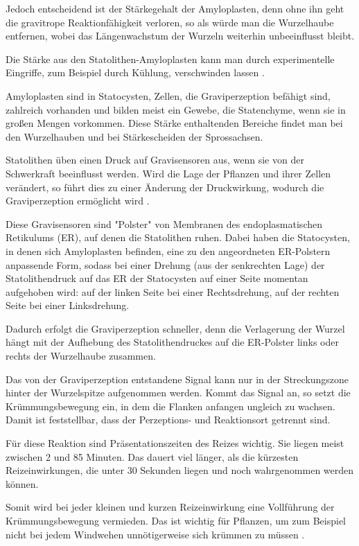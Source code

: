 \documentclass[
a4paper, 
11pt, 
ngerman,
listof=totoc,
bibliography=totocnumbered,
abstracton
]{scrreprt}
\begin{document}
Jedoch entscheidend ist der Stärkegehalt  der Amyloplasten, denn ohne ihn geht die gravitrope Reaktionfähigkeit verloren, so als würde man die Wurzelhaube entfernen, wobei das Längenwachstum der Wurzeln weiterhin unbeeinflusst bleibt.

Die Stärke aus den Statolithen-Amyloplasten kann man durch experimentelle Eingriffe, zum Beispiel durch Kühlung, verschwinden lassen \parencite[452]{Strasburger}.

Amyloplasten sind in Statocysten, Zellen, die Graviperzeption befähigt sind, zahlreich vorhanden und bilden meist ein Gewebe, die Statenchyme, wenn sie in großen Mengen vorkommen. Diese Stärke enthaltenden Bereiche findet man bei den Wurzelhauben und bei Stärkescheiden der Sprossachsen.  

Statolithen üben einen Druck auf Gravisensoren aus, wenn sie von der Schwerkraft beeinflusst werden. Wird die Lage der Pflanzen und ihrer Zellen verändert, so führt dies zu einer Änderung der Druckwirkung, wodurch die Graviperzeption ermöglicht wird \parencite[501f]{Nultsch}.

Diese Gravisensoren sind "Polster" von Membranen des endoplasmatischen Retikulums (ER), auf denen die Statolithen ruhen.
Dabei haben die Statocysten, in denen sich Amyloplasten befinden, eine zu den angeordneten ER-Polstern anpassende Form, sodass bei einer Drehung (aus der senkrechten Lage) der Statolithendruck auf das ER der Statocysten auf einer Seite momentan aufgehoben wird: auf der linken Seite bei einer Rechtsdrehung, auf der rechten Seite bei einer Linksdrehung.

Dadurch erfolgt die Graviperzeption schneller, denn die Verlagerung der Wurzel hängt  mit der Aufhebung des Statolithendruckes auf die ER-Polster links oder rechts der Wurzelhaube zusammen. 

Das von der Graviperzeption entstandene Signal kann nur in der Streckungszone hinter der Wurzelspitze aufgenommen werden. Kommt das Signal an, so setzt die Krümmungsbewegung ein, in dem die Flanken anfangen ungleich zu wachsen. Damit ist feststellbar, dass der Perzeptions- und Reaktionsort getrennt sind.

Für diese Reaktion sind Präsentationszeiten des Reizes wichtig. Sie liegen meist zwischen 2 und 85 Minuten. Das dauert viel länger, als die kürzesten Reizeinwirkungen, die unter 30 Sekunden liegen und noch wahrgenommen werden können.

Somit wird bei jeder kleinen und kurzen Reizeinwirkung eine Vollführung der Krümmungsbewegung vermieden. Das ist wichtig für Pflanzen, um zum Beispiel nicht bei jedem Windwehen unnötigerweise  sich krümmen zu müssen \parencite[531]{Luettge}.  
\end{document}
